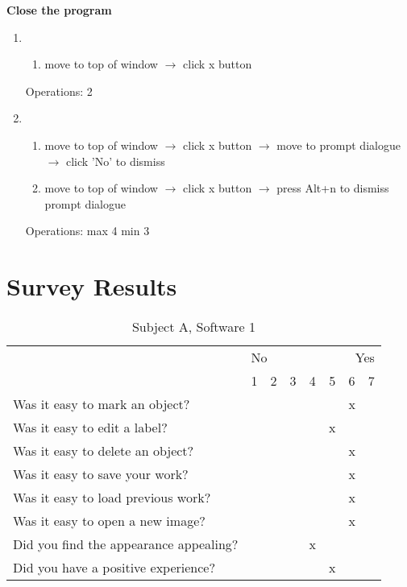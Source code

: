 \documentclass[a4paper,11pt,oneside]{article}
\begin{document}
{\bf Close the program}
\begin{enumerate}
    \item
    \begin{enumerate}
        \item move to top of window $\rightarrow$ click x button
    \end{enumerate}
    Operations: 2
    \item
    \begin{enumerate}
        \item move to top of window $\rightarrow$ click x button $\rightarrow$ move to prompt dialogue $\rightarrow$ click 'No' to dismiss
        \item move to top of window $\rightarrow$ click x button $\rightarrow$ press Alt+n to dismiss prompt dialogue
    \end{enumerate}
    Operations: max 4 min 3
\end{enumerate}

\section{Survey Results}
\label{sec:survey}

\begin{table}[h!]

\centering
\caption{Subject A, Software 1}

\vspace{10px}
\begin{tabular}{ p{7cm} | c | c | c | c | c | c | c | }
    \cline{2-8}
     & \multicolumn{3}{|l}{No} & \multicolumn{1}{c}{ } & \multicolumn{3}{r|}{Yes} \\
    \cline{2-8}
      & 1 & 2 & 3 & 4 & 5 & 6 & 7 \\
    \hline
    \multicolumn{1}{|l|}{Was it easy to mark an object?} & & & & & & x & \\
    \hline
    \multicolumn{1}{|l|}{Was it easy to edit a label?} & & & & & x & & \\
    \hline
    \multicolumn{1}{|l|}{Was it easy to delete an object?} & & & & & & x & \\
    \hline
    \multicolumn{1}{|l|}{Was it easy to save your work?} & & & & & & x & \\
    \hline
    \multicolumn{1}{|l|}{Was it easy to load previous work?} & & & & & & x & \\
    \hline
    \multicolumn{1}{|l|}{Was it easy to open a new image?} & & & & & & x & \\
    \hline
    \multicolumn{1}{|l|}{Did you find the appearance appealing?} & & & & x & & & \\
    \hline
    \multicolumn{1}{|l|}{Did you have a positive experience?} & & & & & x & & \\
    \hline
\end{tabular} 
\label{tab:a1}
\end{table}
\end{document}

